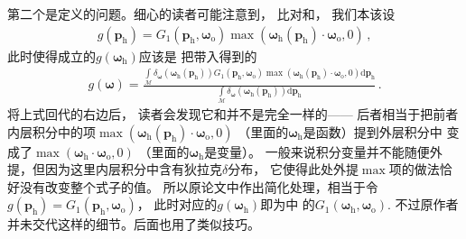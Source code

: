 第二个是定义的问题。细心的读者可能注意到，
比对和，
我们本该设
\begin{align}\label{eq:08ex01-AnotherSpaceFunc}
    g({\bm p}_{\mathrm{h}})=G_1({\bm p}_{\mathrm{h}},{\bm\omega}_{\mathrm{o}})
    \max({\bm\omega}_{\mathrm{h}}({\bm p}_{\mathrm{h}})\cdot{\bm\omega}_{\mathrm{o}},0)\, ,
\end{align}
此时使得成立的$g({\bm\omega}_{\mathrm{h}})$应该是
把带入得到的
\begin{align}\label{eq:08ex01-AnotherStaticFunc}
    g({\bm\omega})=\frac{\displaystyle\int\limits_{\mathcal{M}}
    \delta_{\bm\omega}({\bm\omega}_{\mathrm{h}}({\bm p}_{\mathrm{h}}))
    G_1({\bm p}_{\mathrm{h}},{\bm\omega}_{\mathrm{o}})
    \max({\bm\omega}_{\mathrm{h}}({\bm p}_{\mathrm{h}})\cdot{\bm\omega}_{\mathrm{o}},0)
    \mathrm{d}{\bm p}_{\mathrm{h}}}
    {\displaystyle\int\limits_{\mathcal{M}}
    \delta_{\bm\omega}({\bm\omega}_{\mathrm{h}}({\bm p}_{\mathrm{h}}))
    \mathrm{d}{\bm p}_{\mathrm{h}}}\, .
\end{align}
将上式回代的右边后，
读者会发现它和并不是完全一样的——
后者相当于把前者内层积分中的项$\max({\bm\omega}_{\mathrm{h}}({\bm p}_{\mathrm{h}})\cdot{\bm\omega}_{\mathrm{o}},0)$
（里面的${\bm\omega}_{\mathrm{h}}$是函数）提到外层积分中
变成了$\max({\bm\omega}_{\mathrm{h}}\cdot{\bm\omega}_{\mathrm{o}},0)$
（里面的${\bm\omega}_{\mathrm{h}}$是变量）。
一般来说积分变量并不能随便外提，但因为这里内层积分中含有狄拉克$\delta$分布，
它使得此处外提$\max$项的做法恰好没有改变整个式子的值。
所以原论文中作出简化处理，相当于令$g({\bm p}_{\mathrm{h}})=G_1({\bm p}_{\mathrm{h}},{\bm\omega}_{\mathrm{o}})$，
此时对应的$g({\bm\omega}_{\mathrm{h}})$即为中
的$G_1({\bm\omega}_{\mathrm{h}},{\bm\omega}_{\mathrm{o}})$.
不过原作者并未交代这样的细节。后面也用了类似技巧。

